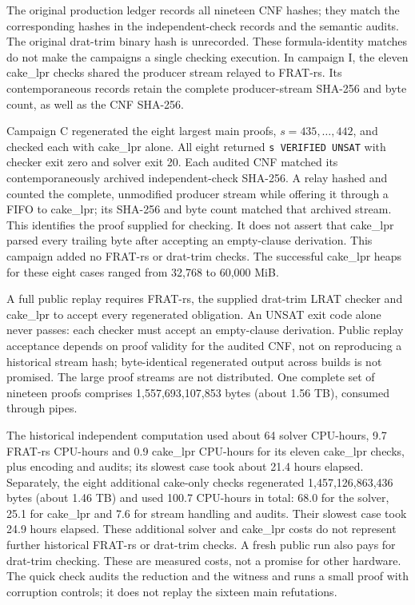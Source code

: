 \documentclass[11pt]{article}
\begin{document}
The original production ledger records all nineteen CNF hashes; they match the corresponding hashes in the independent-check records and the semantic audits. The original drat-trim binary hash is unrecorded. These formula-identity matches do not make the campaigns a single checking execution. In campaign I, the eleven cake\_lpr checks shared the producer stream relayed to FRAT-rs. Its contemporaneous records retain the complete producer-stream SHA-256 and byte count, as well as the CNF SHA-256.

Campaign C regenerated the eight largest main proofs, $s=435,\ldots,442$, and checked each with cake\_lpr alone. All eight returned \texttt{s VERIFIED UNSAT} with checker exit zero and solver exit 20. Each audited CNF matched its contemporaneously archived independent-check SHA-256. A relay hashed and counted the complete, unmodified producer stream while offering it through a FIFO to cake\_lpr; its SHA-256 and byte count matched that archived stream. This identifies the proof supplied for checking. It does not assert that cake\_lpr parsed every trailing byte after accepting an empty-clause derivation. This campaign added no FRAT-rs or drat-trim checks. The successful cake\_lpr heaps for these eight cases ranged from 32,768 to 60,000 MiB.

A full public replay requires FRAT-rs, the supplied drat-trim LRAT checker and cake\_lpr to accept every regenerated obligation. An UNSAT exit code alone never passes: each checker must accept an empty-clause derivation. Public replay acceptance depends on proof validity for the audited CNF, not on reproducing a historical stream hash; byte-identical regenerated output across builds is not promised. The large proof streams are not distributed. One complete set of nineteen proofs comprises 1,557,693,107,853 bytes (about 1.56 TB), consumed through pipes.

The historical independent computation used about 64 solver CPU-hours, 9.7 FRAT-rs CPU-hours and 0.9 cake\_lpr CPU-hours for its eleven cake\_lpr checks, plus encoding and audits; its slowest case took about 21.4 hours elapsed. Separately, the eight additional cake-only checks regenerated 1,457,126,863,436 bytes (about 1.46 TB) and used 100.7 CPU-hours in total: 68.0 for the solver, 25.1 for cake\_lpr and 7.6 for stream handling and audits. Their slowest case took 24.9 hours elapsed. These additional solver and cake\_lpr costs do not represent further historical FRAT-rs or drat-trim checks. A fresh public run also pays for drat-trim checking. These are measured costs, not a promise for other hardware. The quick check audits the reduction and the witness and runs a small proof with corruption controls; it does not replay the sixteen main refutations.
\end{document}
